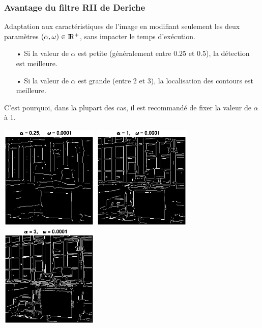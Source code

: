 \documentclass{beamer}
\begin{document}
\begin{frame}
\frametitle{Avantage du filtre RII de Deriche}
Adaptation aux caractéristiques de l'image en modifiant seulement les deux paramètres $ (\alpha, \omega) \in \rm I\!R^+ $, sans impacter le temps d'exécution.
\begin{itemize}
\item[•] Si la valeur de $ \alpha $ est petite (généralement entre $ 0.25 $ et $ 0.5 $), la détection est meilleure.
\item[•] Si la valeur de $ \alpha $ est grande (entre 2 et 3), la localisation des contours est meilleure.
\end{itemize}
\noindent
C'est pourquoi, dans la plupart des cas, il est recommandé de fixer la valeur de $ \alpha $ à 1.\\
\vspace{0.2cm}
\centerline{\includegraphics[trim = 3cm 0cm 3cm 0cm, clip, height=5cm]{Images/alpha025}
\hspace{0.2cm} 
\includegraphics[trim = 3cm 0cm 3cm 0cm, clip, height=5cm]{Images/alpha1} \hspace{0.2cm} 
\includegraphics[trim = 3cm 0cm 3cm 0cm, clip, height=5cm]{Images/alpha3} \hspace{0.2cm}}

\end{frame}
\end{document}
